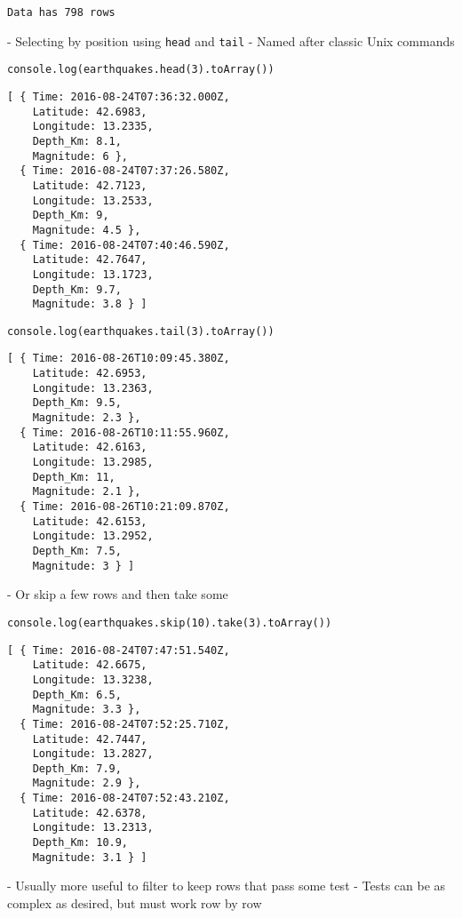 \begin{verbatim}
Data has 798 rows
\end{verbatim}

-   Selecting by position using \texttt{head} and \texttt{tail}
    -   Named after classic Unix commands

\begin{verbatim}
console.log(earthquakes.head(3).toArray())
\end{verbatim}

\begin{verbatim}
[ { Time: 2016-08-24T07:36:32.000Z,
    Latitude: 42.6983,
    Longitude: 13.2335,
    Depth_Km: 8.1,
    Magnitude: 6 },
  { Time: 2016-08-24T07:37:26.580Z,
    Latitude: 42.7123,
    Longitude: 13.2533,
    Depth_Km: 9,
    Magnitude: 4.5 },
  { Time: 2016-08-24T07:40:46.590Z,
    Latitude: 42.7647,
    Longitude: 13.1723,
    Depth_Km: 9.7,
    Magnitude: 3.8 } ]
\end{verbatim}

\begin{verbatim}
console.log(earthquakes.tail(3).toArray())
\end{verbatim}

\begin{verbatim}
[ { Time: 2016-08-26T10:09:45.380Z,
    Latitude: 42.6953,
    Longitude: 13.2363,
    Depth_Km: 9.5,
    Magnitude: 2.3 },
  { Time: 2016-08-26T10:11:55.960Z,
    Latitude: 42.6163,
    Longitude: 13.2985,
    Depth_Km: 11,
    Magnitude: 2.1 },
  { Time: 2016-08-26T10:21:09.870Z,
    Latitude: 42.6153,
    Longitude: 13.2952,
    Depth_Km: 7.5,
    Magnitude: 3 } ]
\end{verbatim}

-   Or skip a few rows and then take some

\begin{verbatim}
console.log(earthquakes.skip(10).take(3).toArray())
\end{verbatim}

\begin{verbatim}
[ { Time: 2016-08-24T07:47:51.540Z,
    Latitude: 42.6675,
    Longitude: 13.3238,
    Depth_Km: 6.5,
    Magnitude: 3.3 },
  { Time: 2016-08-24T07:52:25.710Z,
    Latitude: 42.7447,
    Longitude: 13.2827,
    Depth_Km: 7.9,
    Magnitude: 2.9 },
  { Time: 2016-08-24T07:52:43.210Z,
    Latitude: 42.6378,
    Longitude: 13.2313,
    Depth_Km: 10.9,
    Magnitude: 3.1 } ]
\end{verbatim}

-   Usually more useful to filter to keep rows that pass some test
    -   Tests can be as complex as desired, but must work row by row

